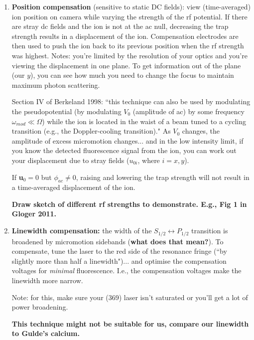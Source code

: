 \documentclass{article}
\begin{document}
\begin{enumerate}
\item \textbf{Position compensation} (sensitive to static DC fields): view (time-averaged) ion position on camera while varying the strength of the rf potential. If there are stray dc fields and the ion is not at the ac null, decreasing the trap strength results in a displacement of the ion. Compensation electrodes are then used to push the ion back to its previous position when the rf strength was highest. Notes: you're limited by the resolution of your optics and you're viewing the displacement in one plane. To get information out of the plane (our $y$), you can see how much you need to change the focus to maintain maximum photon scattering. 

Section IV of Berkeland 1998: ``this technique can also be used by modulating the pseudopotential (by modulating $V_0$ (amplitude of ac) by some frequency $\omega_{mod} \ll \Omega$) while the ion is located in the waist of a beam tuned to a cycling transition (e.g., the Doppler-cooling transition)." As $V_0$ changes, the amplitude of excess micromotion changes... and in the low intensity limit, if you know the detected fluorescence signal from the ion, you can work out your displacement due to stray fields ($u_{0i}$, where $i = x, y$).

If \textbf{u}$_0 = 0$ but $\phi_{ac} \neq 0$, raising and lowering the trap strength will not result in a time-averaged displacement of the ion.

\textbf{Draw sketch of different rf strengths to demonstrate. E.g., Fig 1 in Gloger 2011.}

\item \textbf{Linewidth compensation:} the width of the $S_{1/2} \leftrightarrow P_{1/2}$ transition is broadened by micromotion sidebands (\textbf{what does that mean?}). To compensate, tune the laser to the red side of the resonance fringe (``by slightly more than half a linewidth")... and optimise the compensation voltages for \textit{minimal} fluorescence. I.e., the compensation voltages make the linewidth more narrow. 

Note: for this, make sure your (369) laser isn't saturated or you'll get a lot of power broadening. 

\textbf{This technique might not be suitable for us, compare our linewidth to Gulde's calcium.}


\end{enumerate}
\end{document}

